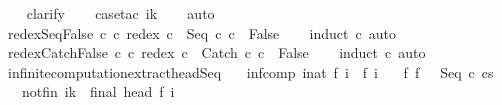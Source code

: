 \begin{isabellebody}
%
\isadelimproof
\ \ %
\endisadelimproof
%
\isatagproof
{}\isamarkupfalse%
\ clarify\isanewline
\ \ \isamarkupfalse%
\ {\isacharparenleft}case{\isacharunderscore}tac\ {\isachardoublequoteopen}i{\isacharequal}k{\isachardoublequoteclose}{\isacharparenright}\isanewline
\ \ \isamarkupfalse%
\ auto\isanewline
\ \ \isamarkupfalse%
%
\endisatagproof
{\isafoldproof}%
%
\isadelimproof
\isanewline
%
\endisadelimproof
\isanewline
{}\isamarkupfalse%
\ redex{\isacharunderscore}Seq{\isacharunderscore}False{\isacharcolon}\ {\isachardoublequoteopen}{\isasymAnd}c{\isacharprime}\ c{\isacharprime}{\isacharprime}{\isachardot}\ {\isacharparenleft}redex\ c\ {\isacharequal}\ Seq\ c{\isacharprime}{\isacharprime}\ c{\isacharprime}{\isacharparenright}\ {\isacharequal}\ False{\isachardoublequoteclose}\isanewline
%
\isadelimproof
\ \ %
\endisadelimproof
%
\isatagproof
{}\isamarkupfalse%
\ {\isacharparenleft}induct\ c{\isacharparenright}\ auto%
\endisatagproof
{\isafoldproof}%
%
\isadelimproof
\isanewline
%
\endisadelimproof
\isanewline
{}\isamarkupfalse%
\ redex{\isacharunderscore}Catch{\isacharunderscore}False{\isacharcolon}\ {\isachardoublequoteopen}{\isasymAnd}c{\isacharprime}\ c{\isacharprime}{\isacharprime}{\isachardot}\ {\isacharparenleft}redex\ c\ {\isacharequal}\ Catch\ c{\isacharprime}{\isacharprime}\ c{\isacharprime}{\isacharparenright}\ {\isacharequal}\ False{\isachardoublequoteclose}\isanewline
%
\isadelimproof
\ \ %
\endisadelimproof
%
\isatagproof
{}\isamarkupfalse%
\ {\isacharparenleft}induct\ c{\isacharparenright}\ auto%
\endisatagproof
{\isafoldproof}%
%
\isadelimproof
\isanewline
%
\endisadelimproof
\isanewline
\isanewline
{}\isamarkupfalse%
\ infinite{\isacharunderscore}computation{\isacharunderscore}extract{\isacharunderscore}head{\isacharunderscore}Seq{\isacharcolon}\isanewline
\ \ \ inf{\isacharunderscore}comp{\isacharcolon}\ {\isachardoublequoteopen}{\isasymforall}i{\isacharcolon}{\isacharcolon}nat{\isachardot}\ {\isasymGamma}{\isasymturnstile}f\ i\ {\isasymrightarrow}\ f\ {\isacharparenleft}i{\isacharplus}{}{\isacharparenright}{\isachardoublequoteclose}\isanewline
\ \ \ f{\isacharunderscore}{}{\isacharcolon}\ {\isachardoublequoteopen}f\ {}\ {\isacharequal}\ {\isacharparenleft}Seq\ c\ cs{\isacharparenright}{\isachardoublequoteclose}\isanewline
\ \ \ not{\isacharunderscore}fin{\isacharcolon}\ {\isachardoublequoteopen}{\isasymforall}i{\isacharless}k{\isachardot}\ {\isasymnot}\ final\ {\isacharparenleft}head\ {\isacharparenleft}f\ i{\isacharparenright}{\isacharparenright}{\isachardoublequoteclose}\isanewline

\end{isabellebody}
